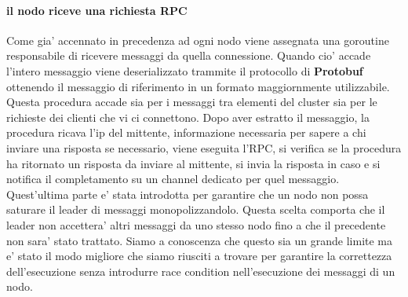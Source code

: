 \paragraph{il nodo riceve una richiesta RPC}
Come gia' accennato in precedenza ad ogni nodo viene assegnata una goroutine responsabile di
ricevere messaggi da quella connessione. Quando cio' accade l'intero messaggio viene deserializzato
trammite il protocollo di \textbf{Protobuf} ottenendo il messaggio di riferimento in un formato 
maggiornmente utilizzabile. Questa procedura accade sia per i messaggi tra elementi del cluster
sia per le richieste dei clienti che vi ci connettono.
Dopo aver estratto il messaggio, la procedura ricava l'ip del mittente, informazione necessaria per sapere a chi inviare una risposta se necessario,
viene eseguita l'RPC, si verifica se la procedura ha ritornato un risposta da inviare al mittente,
si invia la risposta in caso e si notifica il completamento su un channel dedicato 
per quel messaggio. Quest'ultima parte e' stata introdotta per garantire che un nodo non possa 
saturare il leader di messaggi monopolizzandolo. Questa scelta comporta che il leader non accettera' 
altri messaggi da uno stesso nodo fino a che il precedente non sara' stato trattato. Siamo a 
conoscenza che questo sia un grande limite ma e' stato il modo migliore che siamo riusciti 
a trovare per garantire la correttezza dell'esecuzione senza introdurre race condition nell'esecuzione
dei messaggi di un nodo.


